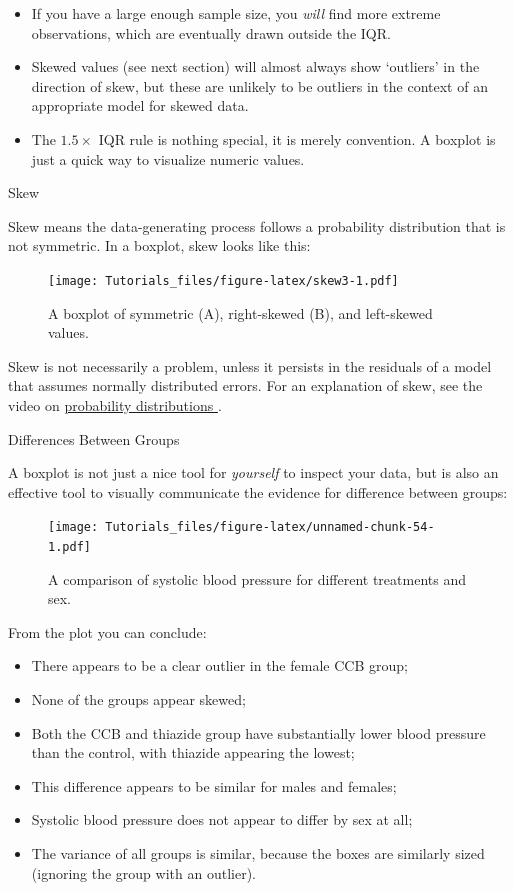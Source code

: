 \documentclass[
]{book}
\providecommand{\tightlist}{%
  \setlength{\itemsep}{0pt}\setlength{\parskip}{0pt}}
\begin{document}
\begin{itemize}
\tightlist
\item
  If you have a large enough sample size, you \emph{will} find more extreme observations, which are eventually drawn outside the IQR.
\item
  Skewed values (see next section) will almost always show `outliers' in the direction of skew, but these are unlikely to be outliers in the context of an appropriate model for skewed data.
\item
  The \(1.5\times\) IQR rule is nothing special, it is merely convention. A boxplot is just a quick way to visualize numeric values.
\end{itemize}

Skew

Skew means the data-generating process follows a probability distribution that is not symmetric. In a boxplot, skew looks like this:

\begin{figure}
\centering
\texttt{[image: Tutorials\_files/figure-latex/skew3-1.pdf]}
\caption{\label{fig:skew3}A boxplot of symmetric (A), right-skewed (B), and left-skewed values.}
\end{figure}

Skew is not necessarily a problem, unless it persists in the residuals of a model that assumes normally distributed errors. For an explanation of skew, see the video on \href{https://youtu.be/jdfG7rKPVNk}{probability distributions }.

Differences Between Groups

A boxplot is not just a nice tool for \emph{yourself} to inspect your data, but is also an effective tool to visually communicate the evidence for difference between groups:

\begin{figure}
\centering
\texttt{[image: Tutorials\_files/figure-latex/unnamed-chunk-54-1.pdf]}
\caption{\label{fig:unnamed-chunk-54}A comparison of systolic blood pressure for different treatments and sex.}
\end{figure}

From the plot you can conclude:

\begin{itemize}
\tightlist
\item
  There appears to be a clear outlier in the female CCB group;
\item
  None of the groups appear skewed;
\item
  Both the CCB and thiazide group have substantially lower blood pressure than the control, with thiazide appearing the lowest;
\item
  This difference appears to be similar for males and females;
\item
  Systolic blood pressure does not appear to differ by sex at all;
\item
  The variance of all groups is similar, because the boxes are similarly sized (ignoring the group with an outlier).
\end{itemize}
\end{document}

